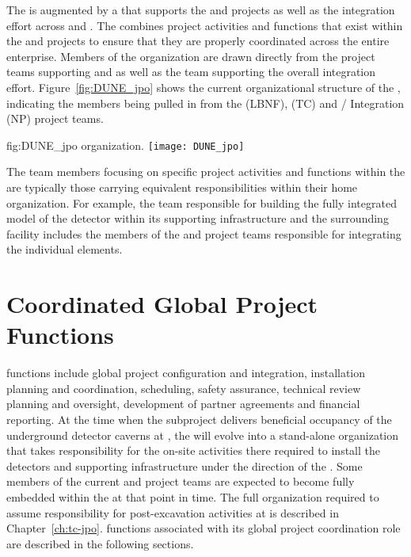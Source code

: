 The  is augmented by a  that supports the
 and  projects as well as the integration
effort across  and . The  combines
project activities and functions that exist within the  and 
projects to ensure that they are properly coordinated across the
entire enterprise.  Members of the  organization are drawn directly
from the project teams supporting  and  as well as the team
supporting the overall integration effort.  Figure~\ref{fig:DUNE_jpo} shows the
current organizational structure of the , indicating the members
being pulled in from the  (LBNF),  (TC) and /
Integration (NP) project teams.
\begin{dunefigure}{fig:DUNE_jpo}
  { organization.}
  \texttt{[image: DUNE\_jpo]}
\end{dunefigure}
The team members focusing on specific project activities and functions
within the  are typically those carrying equivalent
responsibilities within their home organization.  For example, the
 team responsible for building the fully integrated model
of the detector within its supporting infrastructure and the
surrounding facility includes the members of the  and
 project teams responsible for integrating the individual
elements.

\section{Coordinated Global Project Functions}
\label{sec:global_project}

 functions include global project configuration and integration,
installation planning and coordination, scheduling, safety assurance,
technical review planning and oversight, development of partner
agreements and financial reporting.  At the time when the 
 subproject delivers beneficial occupancy of
the underground detector caverns at , the  will evolve into a
stand-alone organization that takes responsibility for the on-site
activities %
there required to install the detectors and supporting
infrastructure under the direction of the .
Some members of the current  and  project teams are
expected to become fully embedded within the  at that point in
time.  The full  organization required to assume responsibility for
post-excavation activities at  is described in Chapter~\ref{ch:tc-jpo}.
 functions associated with its global project coordination role
are described in the following sections.

